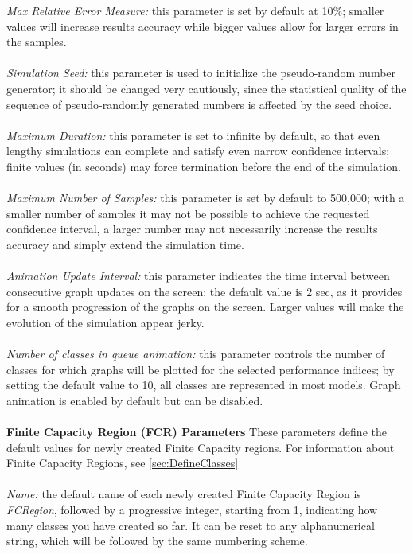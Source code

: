 \emph{Max Relative Error Measure:}
this parameter is set by default at 10\%; smaller values will increase results accuracy while bigger values allow for larger errors in the samples.\\\\
\emph{Simulation Seed:}
this parameter is used to initialize the pseudo-random number generator; it should be changed very cautiously, since the statistical quality of the sequence of pseudo-randomly generated numbers is affected by the seed choice.\\\\
\emph{Maximum Duration:}
this parameter is set to infinite by default, so that even lengthy simulations can complete and satisfy even narrow confidence intervals; finite values (in seconds) may force termination before the end of the simulation.\\\\
\emph{Maximum Number of Samples: }
this parameter is set by default to 500,000; with a smaller number of samples it may not be possible to achieve the requested confidence interval, a larger number may not necessarily increase the results accuracy and simply extend the simulation time.\\\\
\emph{Animation Update Interval:}
this parameter indicates the time interval between consecutive graph updates on the screen; the default value is 2 sec, as it provides for a smooth progression of the graphs on the screen. Larger values will make the evolution of the simulation appear jerky.\\\\
\emph{Number of classes in queue animation: }
this parameter controls the number of classes for which graphs will be plotted for the selected performance indices; by setting the default value to 10, all classes are represented in most models. Graph animation is enabled by default but can be disabled.\\\\
\textbf{Finite Capacity Region (FCR) Parameters}
These parameters define the default values for newly created Finite Capacity regions. For information about Finite Capacity Regions, see \autoref{sec:DefineClasses}\\\\
\emph{Name:}
the default name of each newly created Finite Capacity Region is \emph{FCRegion}, followed by a progressive integer, starting from 1, indicating how many classes you have created so far. It can be reset to any alphanumerical string, which will be followed by the same numbering scheme.\\\\
